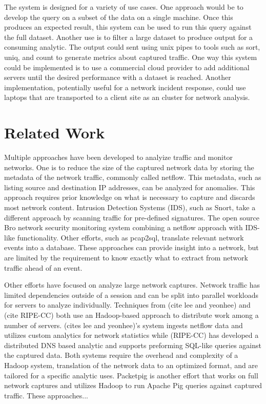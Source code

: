 \documentclass{article}
\begin{document}
\begin{multicols}{2}
The system is designed for a variety of use cases. One approach would be to develop the query on a subset of the data on a single machine.  Once this produces an expected result, this system can be used to run this query against the full dataset.  Another use is to filter a large dataset to produce output for a consuming analytic. The output could sent using unix pipes to tools such as sort, uniq, and count to generate metrics about captured traffic.  One way this system could be implemented is to use a commercial cloud provider to add additional servers until the desired performance with a dataset is reached. Another implementation, potentially useful for a network incident response, could use laptops that are transported to a client site as an cluster for network analysis.

\section{Related Work}

Multiple approaches have been developed to analyize traffic and monitor networks. One is to reduce the size of the captured network data by storing the metadata of the network traffic, commonly called netflow.  This metadata, such as listing source and destination IP addresses, can be analyzed for anomalies.  This approach requires prior knowledge on what is necessary to capture and discards most network content. Intrusion Detection Systems (IDS), such as Snort, take a different approach by scanning traffic for pre-defined signatures. The open source Bro network security monitoring system combining a netflow approach with IDS-like functionality.  Other efforts, such as pcap2sql, translate relevant network events into a database. These approaches can provide insight into a network, but are limited by the requirement to know exactly what to extract from network traffic ahead of an event. 

Other efforts have focused on analyze large network captures. Network traffic has limited dependencies outside of a session and can be split into parallel workloads for servers to analyze individually.  Techniques from (cite lee and yeonhee) and (cite RIPE-CC) both use an Hadoop-based approach to distribute work among a number of servers.  (cites lee and yeonhee)'s system ingests netflow data and utilizes custom analytics for network statistics while (RIPE-CC) has developed a distributed DNS based analytic and supports preforming SQL-like queries against the captured data.  Both systems require the overhead and complexity of a Hadoop system, translation of the network data to an optimized format, and are tailored for a specific analytic uses.  Packetpig is another effort that works on full network captures and utilizes Hadoop to run Apache Pig queries against captured traffic.  These approaches...


\end{multicols}
\end{document}
